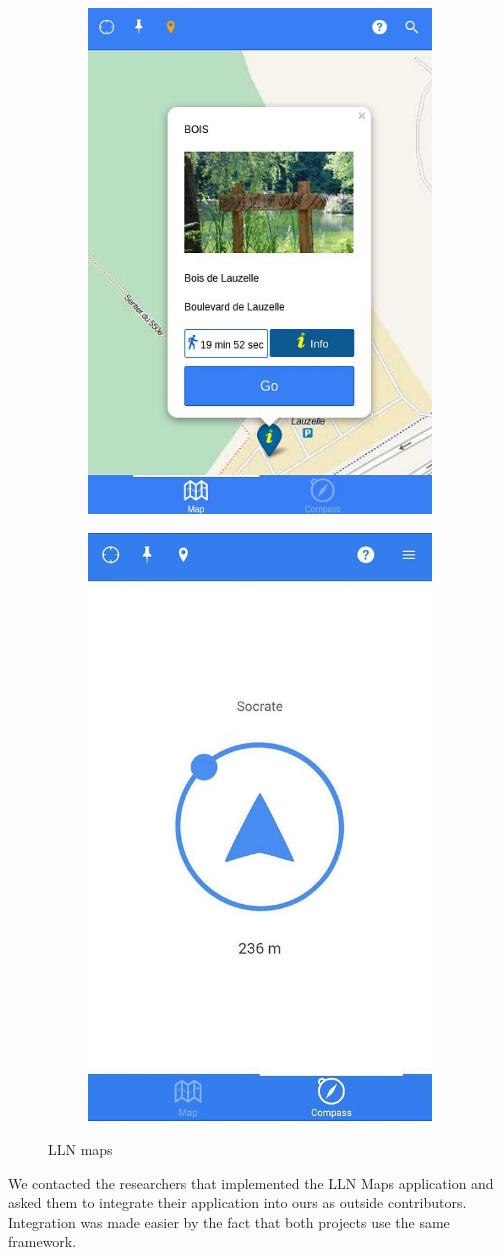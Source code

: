 \documentclass{eplmastersthesis}
\begin{document}
\begin{figure}[H]
\centering
\begin{subfigure}{.5\textwidth}
  \centering
  \includegraphics[width=.6\linewidth]{Images/llnmaps1.jpg}
  \label{fig:sub1}
\end{subfigure}%
\begin{subfigure}{.5\textwidth}
  \centering
  \includegraphics[width=.55\linewidth]{Images/llnmaps2.jpg}
  \label{fig:sub2}
\end{subfigure}
\caption{LLN maps}
\label{fig:test}
\end{figure}
We contacted the researchers that implemented the LLN Maps application and asked them to integrate their application into ours as outside contributors. Integration was made easier by the fact that both projects use the same framework.
\end{document}
